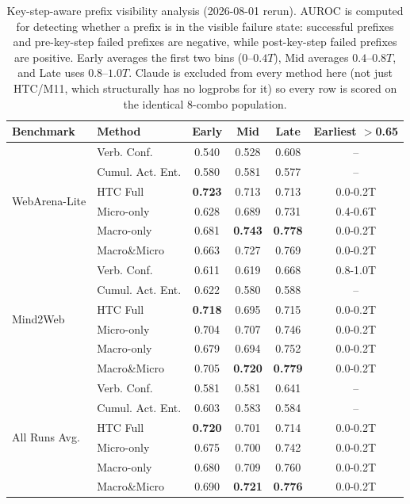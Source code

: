 \begin{table}[t]
\centering
\small
\setlength{\tabcolsep}{4pt}
\renewcommand{\arraystretch}{1.08}
\begin{tabular}{llcccc}
\toprule
\textbf{Benchmark} & \textbf{Method} & \textbf{Early} & \textbf{Mid} & \textbf{Late} & \textbf{Earliest $>$0.65} \\
\midrule
\multirow{6}{*}{WebArena-Lite} & Verb. Conf. & 0.540 & 0.528 & 0.608 & -- \\
 & Cumul. Act. Ent. & 0.580 & 0.581 & 0.577 & -- \\
 & HTC Full & \textbf{0.723} & 0.713 & 0.713 & 0.0-0.2T \\
 & Micro-only & 0.628 & 0.689 & 0.731 & 0.4-0.6T \\
 & Macro-only & 0.681 & \textbf{0.743} & \textbf{0.778} & 0.0-0.2T \\
 & Macro\&Micro & 0.663 & 0.727 & 0.769 & 0.0-0.2T \\
\midrule
\multirow{6}{*}{Mind2Web} & Verb. Conf. & 0.611 & 0.619 & 0.668 & 0.8-1.0T \\
 & Cumul. Act. Ent. & 0.622 & 0.580 & 0.588 & -- \\
 & HTC Full & \textbf{0.718} & 0.695 & 0.715 & 0.0-0.2T \\
 & Micro-only & 0.704 & 0.707 & 0.746 & 0.0-0.2T \\
 & Macro-only & 0.679 & 0.694 & 0.752 & 0.0-0.2T \\
 & Macro\&Micro & 0.705 & \textbf{0.720} & \textbf{0.779} & 0.0-0.2T \\
\midrule
\multirow{6}{*}{All Runs Avg.} & Verb. Conf. & 0.581 & 0.581 & 0.641 & -- \\
 & Cumul. Act. Ent. & 0.603 & 0.583 & 0.584 & -- \\
 & HTC Full & \textbf{0.720} & 0.701 & 0.714 & 0.0-0.2T \\
 & Micro-only & 0.675 & 0.700 & 0.742 & 0.0-0.2T \\
 & Macro-only & 0.680 & 0.709 & 0.760 & 0.0-0.2T \\
 & Macro\&Micro & 0.690 & \textbf{0.721} & \textbf{0.776} & 0.0-0.2T \\
\bottomrule
\end{tabular}
\caption{Key-step-aware prefix visibility analysis (2026-08-01 rerun). AUROC is computed for detecting whether a prefix is in the visible failure state: successful prefixes and pre-key-step failed prefixes are negative, while post-key-step failed prefixes are positive. Early averages the first two bins ($0$--$0.4T$), Mid averages $0.4$--$0.8T$, and Late uses $0.8$--$1.0T$. Claude is excluded from every method here (not just HTC/M11, which structurally has no logprobs for it) so every row is scored on the identical 8-combo population.}
\label{tab:prefix_time_matched8}
\end{table}
